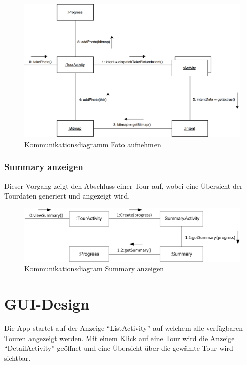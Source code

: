 \documentclass[a4paper,10pt,xetex]{article}
\begin{document}
\begin{figure}
  \includegraphics{Kommunikationsdiagramm_TakePhoto}
  \caption{Kommunikationsdiagramm Foto aufnehmen}
\end{figure}

\subsubsection{Summary anzeigen}
Dieser Vorgang zeigt den Abschluss einer Tour auf, wobei eine Übersicht der Tourdaten
generiert und angezeigt wird.
\begin{figure}
  \includegraphics{Kommunikationsdiagramm_SummaryActivity}
  \caption{Kommunikationsdiagram Summary anzeigen}
\end{figure}

\newpage
\section{GUI-Design}\label{gui-design}
Die App startet auf der Anzeige ``ListActivity'' auf welchem alle verfügbaren Touren angezeigt
werden. Mit einem Klick auf eine Tour wird die Anzeige ``DetailActivity'' geöffnet und eine
Übersicht über die gewählte Tour wird sichtbar.
\end{document}

